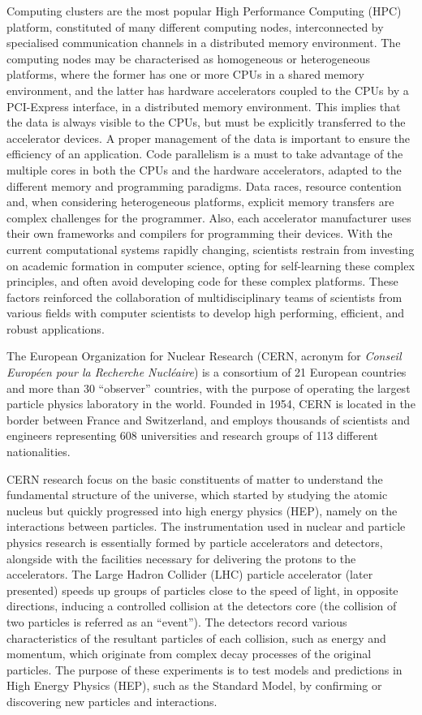 Computing clusters are the most popular High Performance Computing (HPC) platform, constituted of many different computing nodes, interconnected by specialised communication channels in a distributed memory environment. The computing nodes may be characterised as homogeneous or heterogeneous platforms, where the former has one or more CPUs in a shared memory environment, and the latter has hardware accelerators coupled to the CPUs by a PCI-Express interface, in a distributed memory environment. This implies that the data is always visible to the CPUs, but must be explicitly transferred to the accelerator devices. A proper management of the data is important to ensure the efficiency of an application. Code parallelism is a must to take advantage of the multiple cores in both the CPUs and the hardware accelerators, adapted to the different memory and programming paradigms. Data races, resource contention and, when considering heterogeneous platforms, explicit memory transfers are complex challenges for the programmer. Also, each accelerator manufacturer uses their own frameworks and compilers for programming their devices. With the current computational systems rapidly changing, scientists restrain from investing on academic formation in computer science, opting for self-learning these complex principles, and often avoid developing code for these complex platforms. These factors reinforced the collaboration of multidisciplinary teams of scientists from various fields with computer scientists to develop high performing, efficient, and robust applications.

The European Organization for Nuclear Research \cite{CERN} (CERN, acronym for \textit{Conseil Européen pour la Recherche Nucléaire}) is a consortium of 21 European countries and more than 30 ``observer'' countries, with the purpose of operating the largest particle physics laboratory in the world. Founded in 1954, CERN is located in the border between France and Switzerland, and employs thousands of scientists and engineers representing 608 universities and research groups of 113 different nationalities.

CERN research focus on the basic constituents of matter to understand the fundamental structure of the universe, which started by studying the atomic nucleus but quickly progressed into high energy physics (HEP), namely on the interactions between particles. The instrumentation used in nuclear and particle physics research is essentially formed by particle accelerators and detectors, alongside with the facilities necessary for delivering the protons to the accelerators. The Large Hadron Collider (LHC) particle accelerator (later presented) speeds up groups of particles close to the speed of light, in opposite directions, inducing a controlled collision at the detectors core (the collision of two particles is referred as an ``event''). The detectors record various characteristics of the resultant particles of each collision, such as energy and momentum, which originate from complex decay processes of the original particles. The purpose of these experiments is to test models and predictions in High Energy Physics (HEP), such as the Standard Model, by confirming or discovering new particles and interactions.

